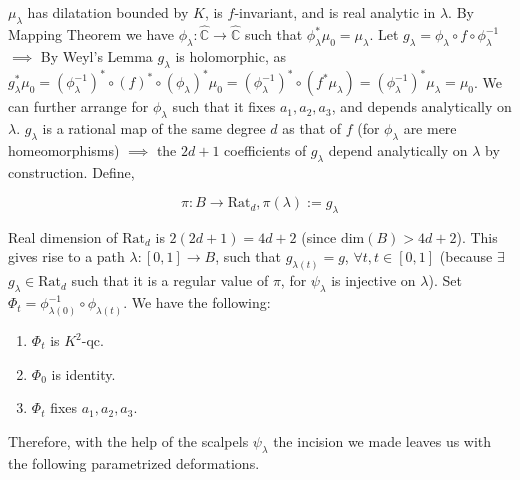 \documentclass[11pt,a4paper]{article}
\begin{document}

        $\mu_{\lambda}$ has dilatation bounded by $K$, is $f$-invariant, and is real analytic in $\lambda$. By Mapping Theorem we have $\phi_{\lambda}:\hat{\mathbb{C}} \rightarrow \hat{\mathbb{C}}$ such that $\phi_{\lambda}^*\mu_0 = \mu_{\lambda}$. Let $g_{\lambda} = \phi_{\lambda}\circ f\circ \phi_{\lambda}^{-1}$ $\implies$ By Weyl's Lemma $g_{\lambda}$ is holomorphic, as $g_{\lambda}^*\mu_0= (\phi^{-1}_{\lambda})^* \circ (f)^*\circ (\phi_{\lambda})^*\mu_0 = (\phi^{-1}_{\lambda})^*\circ (f^*\mu_{\lambda}) = (\phi^{-1}_{\lambda})^*\mu_{\lambda} = \mu_0$. We can further arrange for $\phi_{\lambda}$ such that it fixes $a_1, a_2, a_3$, and depends analytically on $\lambda$. $g_{\lambda}$ is a rational map of the same degree $d$ as that of $f$ (for $\phi_{\lambda}$ are mere homeomorphisms) $\implies$ the $2d+1$ coefficients of $g_{\lambda}$ depend analytically on $\lambda$ by construction. Define,

        $$\pi: B \rightarrow \text{Rat}_d,   \pi(\lambda) := g_{\lambda}$$


        Real dimension of $\text{Rat}_d$ is $2(2d+1) = 4d+2$ (since $\text{dim}(B)>4d+2$). This gives rise to a path $\lambda:[0,1] \rightarrow B$, such that $g_{\lambda(t)} = g$, $\forall t, t\in [0,1]$ (because $\exists$ $g_{\lambda} \in \text{Rat}_d$ such that it is a regular value of $\pi$, for $\psi_{\lambda}$ is injective on $\lambda$). Set $\Phi_t = \phi^{-1}_{\lambda(0)}\circ \phi_{\lambda(t)}$. We have the following:

        \begin{enumerate}
            \item $\Phi_t$ is $K^2$-qc.
            \item $\Phi_0$ is identity.
            \item $\Phi_t$ fixes $a_1, a_2, a_3$.
        \end{enumerate}


        Therefore, with the help of the scalpels $\psi_{\lambda}$ the incision we made leaves us with the following parametrized deformations.
\end{document}
